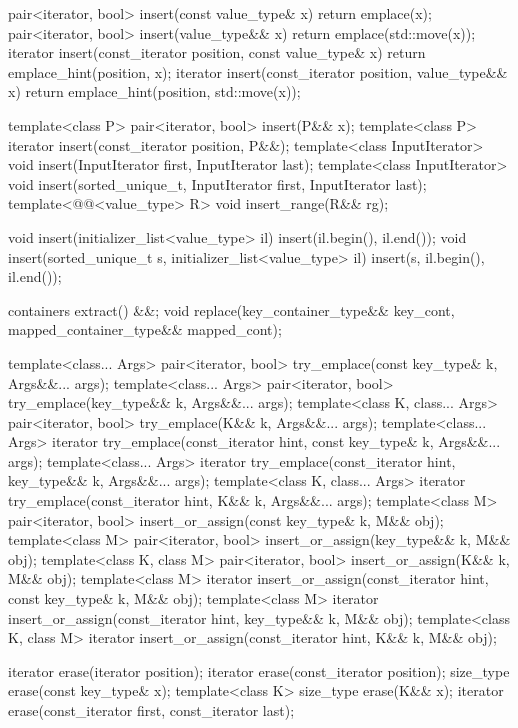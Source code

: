 \begin{codeblock}
{{    pair<iterator, bool> insert(const value_type& x)
      { return emplace(x); }
    pair<iterator, bool> insert(value_type&& x)
      { return emplace(std::move(x)); }
    iterator insert(const_iterator position, const value_type& x)
      { return emplace_hint(position, x); }
    iterator insert(const_iterator position, value_type&& x)
      { return emplace_hint(position, std::move(x)); }

    template<class P> pair<iterator, bool> insert(P&& x);
    template<class P>
      iterator insert(const_iterator position, P&&);
    template<class InputIterator>
      void insert(InputIterator first, InputIterator last);
    template<class InputIterator>
      void insert(sorted_unique_t, InputIterator first, InputIterator last);
    template<@@<value_type> R>
      void insert_range(R&& rg);

    void insert(initializer_list<value_type> il)
      { insert(il.begin(), il.end()); }
    void insert(sorted_unique_t s, initializer_list<value_type> il)
      { insert(s, il.begin(), il.end()); }

    containers extract() &&;
    void replace(key_container_type&& key_cont, mapped_container_type&& mapped_cont);

    template<class... Args>
      pair<iterator, bool> try_emplace(const key_type& k, Args&&... args);
    template<class... Args>
      pair<iterator, bool> try_emplace(key_type&& k, Args&&... args);
    template<class K, class... Args>
      pair<iterator, bool> try_emplace(K&& k, Args&&... args);
    template<class... Args>
      iterator try_emplace(const_iterator hint, const key_type& k, Args&&... args);
    template<class... Args>
      iterator try_emplace(const_iterator hint, key_type&& k, Args&&... args);
    template<class K, class... Args>
      iterator try_emplace(const_iterator hint, K&& k, Args&&... args);
    template<class M>
      pair<iterator, bool> insert_or_assign(const key_type& k, M&& obj);
    template<class M>
      pair<iterator, bool> insert_or_assign(key_type&& k, M&& obj);
    template<class K, class M>
      pair<iterator, bool> insert_or_assign(K&& k, M&& obj);
    template<class M>
      iterator insert_or_assign(const_iterator hint, const key_type& k, M&& obj);
    template<class M>
      iterator insert_or_assign(const_iterator hint, key_type&& k, M&& obj);
    template<class K, class M>
      iterator insert_or_assign(const_iterator hint, K&& k, M&& obj);

    iterator erase(iterator position);
    iterator erase(const_iterator position);
    size_type erase(const key_type& x);
    template<class K> size_type erase(K&& x);
    iterator erase(const_iterator first, const_iterator last);

}}
\end{codeblock}
